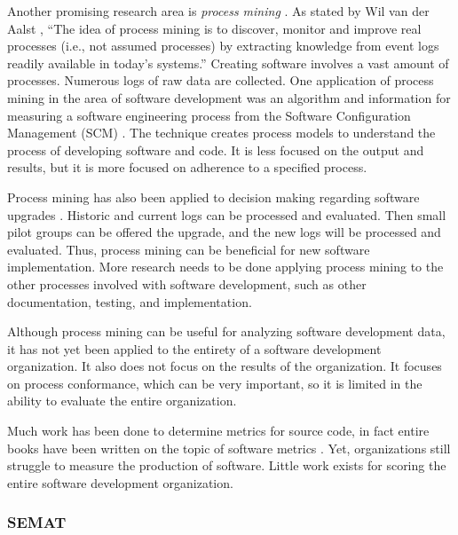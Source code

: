 \documentclass[SDSUThesis.tex]{subfiles}
\begin{document}
    Another promising research area is \textit{process mining}
    \cite{vanderAalst2012}.
    As stated by Wil van der Aalst \cite{vanderAalst2011}, 
    ``The idea of process mining is to discover, monitor
    and improve real
    processes (i.e., not assumed processes) by extracting knowledge from event logs
    readily available in today's systems.''  Creating software involves
    a vast amount of processes.  Numerous logs of raw data are collected.  
    One application of process mining in the area of software development
    was an algorithm and information for measuring a software engineering process from
    the Software Configuration Management (SCM) \cite{Rubin2007}.
    The technique creates process models 
    to understand the process of developing software and code. 
    It is less focused on the output and results,
    but it is more focused on adherence to a specified process.
    
    Process mining has also been applied to decision making regarding software 
    upgrades \cite{Genuchten2014}.  Historic and current logs can be 
    processed and evaluated.
    Then small pilot groups can be offered the upgrade, and the new logs will 
    be processed and evaluated. Thus, process mining can be beneficial for new 
    software implementation.  More research needs to be done applying
    process mining to the other processes involved with software development,
    such as other documentation, testing, and implementation. 
    
    Although process mining can be useful for analyzing software
    development data, it has not yet been applied to the entirety 
    of a software development organization. It also does not
    focus on the results of the organization.  It focuses
    on process conformance, which can be very important, so it
    is limited in the ability to evaluate the entire organization. 

    Much work has been done to determine metrics for source code, in fact 
    entire books have been written on the topic of software 
    metrics \cite{Jones1996, Putnam2013}. Yet, 
    organizations still struggle to measure the production of software.
    Little work exists
    for scoring the entire software development organization. 

\subsubsection{SEMAT}
\end{document}

